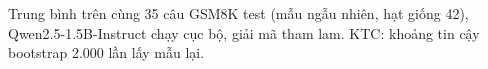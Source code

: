 Trung bình trên cùng 35 câu GSM8K test (mẫu ngẫu nhiên, hạt giống 42), Qwen2.5-1.5B-Instruct chạy cục bộ, giải mã tham lam. KTC: khoảng tin cậy bootstrap 2.000 lần lấy mẫu lại.
